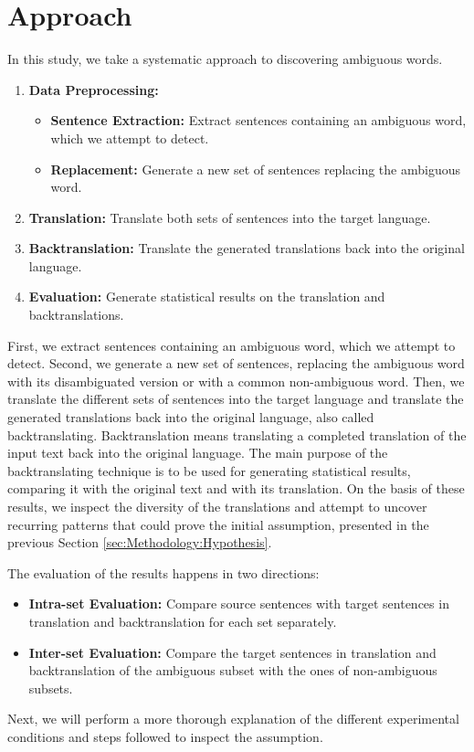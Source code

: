 \section{Approach}
\label{sec:Methodology:Approach}


In this study, we take a systematic approach to discovering ambiguous words. 

\begin{enumerate}
  \item \textbf{Data Preprocessing:}
  \begin{itemize}
    \item \textbf{Sentence Extraction:} Extract sentences containing an ambiguous word, which we attempt to detect.
    \item \textbf{Replacement:} Generate a new set of sentences replacing the ambiguous word.
  \end{itemize}
  \item \textbf{Translation:} Translate both sets of sentences into the target language.
  \item \textbf{Backtranslation:} Translate the generated translations back into the original language.
  \item \textbf{Evaluation:} Generate statistical results on the translation and backtranslations.
\end{enumerate}

First, we extract sentences containing an ambiguous word, which we attempt to detect. Second, we generate a new set of sentences, replacing the ambiguous word with its disambiguated version or with a common non-ambiguous word. Then, we translate the different sets of sentences into the target language and translate the generated translations back into the original language, also called backtranslating.
Backtranslation means translating a completed translation of the input text back into the original language. The main purpose of the backtranslating technique is to be used for generating statistical results, comparing it with the original text and with its translation. On the basis of these results, we inspect the diversity of the translations and attempt to uncover recurring patterns that could prove the initial assumption, presented in the previous Section \ref{sec:Methodology:Hypothesis}. 

The evaluation of the results happens in two directions:
\begin{itemize}
    \item \textbf{Intra-set Evaluation:} Compare source sentences with target sentences in translation and backtranslation for each set separately.
    \item \textbf{Inter-set Evaluation:} Compare the target sentences in translation and backtranslation of the ambiguous subset with the ones of non-ambiguous subsets.
\end{itemize}

Next, we will perform a more thorough explanation of the different experimental conditions and steps followed to inspect the assumption.


